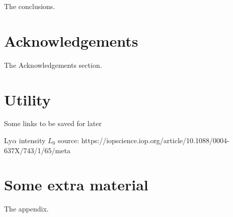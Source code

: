 \documentclass[a4paper,fleqn,usenatbib]{mnras}
\begin{document}
The conclusions.

\section*{Acknowledgements}

The Acknowledgements section.

\section*{Utility}
Some links to be saved for later

Ly$\alpha$ intensity $L_0$ source:
https://iopscience.iop.org/article/10.1088/0004-637X/743/1/65/meta






\appendix

\section{Some extra material}

The appendix.



\bsp	%
\label{lastpage}
\end{document}
